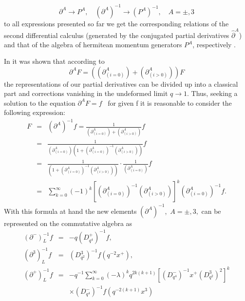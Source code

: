 \documentclass[a4paper,11pt,oneside]{article}
\begin{document}
\begin{equation}
\partial ^{A}\rightarrow P^{A},\quad \left( \partial ^{A}\right)
^{-1}\rightarrow \left( P^{A}\right) ^{-1},\quad A=\pm ,3
\end{equation}
to all expressions presented so far we get the corresponding relations of
the second differential calculus (generated by the conjugated partial
derivatives $\hat{\partial}^A$) and that of the algebra of hermitean
momentum generators $P^A$, respectively \cite{LWW97}.

In \cite{BW01} it was shown that according to 
\begin{equation}
\partial ^{A}F=\left( \left( \partial _{\left( i=0\right) }^{A}\right)
+\left( \partial _{\left( i>0\right) }^{A}\right) \right) F
\end{equation}
the representations of our partial derivatives can be divided up into a
classical part and corrections vanishing in the undeformed limit $%
q\rightarrow 1$. Thus, seeking a solution to the equation $\partial ^{A}F=f$
\ for given f it is reasonable to consider the following expression: 
\begin{eqnarray}
F &=&\left( \partial ^{A}\right) ^{-1}f=\frac{1}{\left( \partial _{\left(
i=0\right) }^{A}\right) +\left( \partial _{\left( i>0\right) }^{A}\right) }f
\label{IntegralE3} \\
&=&\frac{1}{\left( \partial _{\left( i=0\right) }^{A}\right) \left( 1+\left(
\partial _{\left( i=0\right) }^{A}\right) ^{-1}\left( \partial _{\left(
i>0\right) }^{A}\right) \right) }f  \nonumber \\
&=&\frac{1}{\left( 1+\left( \partial _{\left( i=0\right) }^{A}\right)
^{-1}\left( \partial _{\left( i>0\right) }^{A}\right) \right) }\cdot \frac{1%
}{\left( \partial _{\left( i=0\right) }^{A}\right) }f  \nonumber \\
&=&\sum_{k=0}^{\infty }\left( -1\right) ^{k}\left[ \left( \partial _{\left(
i=0\right) }^{A}\right) ^{-1}\left( \partial _{\left( i>0\right)
}^{A}\right) \right] ^{k}\left( \partial _{\left( i=0\right) }^{A}\right)
^{-1}f.  \nonumber
\end{eqnarray}
With this formula at hand the new elements $\left( \partial ^{A}\right)
^{-1} $, $\,A=\pm ,3,$ can be represented on the commutative algebra as
\begin{eqnarray}
\left( \partial ^{-}\right) _{L}^{-1}f &=&-q\left( D_{q^{4}}^{+}\right)
^{-1}f,  \label{repres1} \\
\left( \partial ^{3}\right) _{L}^{-1}f &=&\left( D_{q^{2}}^{3}\right)
^{-1}f\left( q^{-2}x^{+}\right) ,  \nonumber \\
\left( \partial ^{+}\right) _{L}^{-1}f &=&-q^{-1}\sum_{k=0}^{\infty }\left(
-\lambda \right) ^{k}q^{2k\left( k+1\right) }\left[ \left(
D_{q^{4}}^{-}\right) ^{-1}x^{+}\left( D_{q^{2}}^{3}\right) ^{2}\right] ^{k} 
\nonumber \\
&&\times \left( D_{q^{4}}^{-}\right) ^{-1}f\left( q^{-2\left( k+1\right)
}x^{3}\right)   \nonumber
\end{eqnarray}
\end{document}
